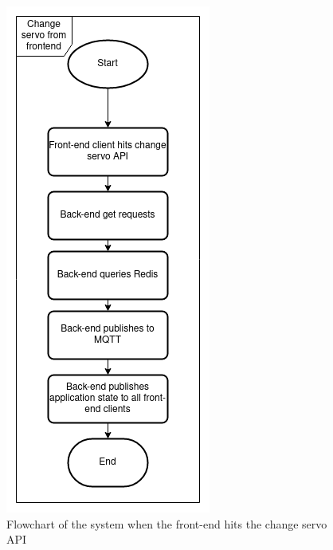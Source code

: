 \begin{figure}
      \centering
      \includegraphics[scale=0.44]{resources/flowchart-fe-change-servo.png}
      \caption{Flowchart of the system when the front-end hits the change servo API}
      \label{flowchart-fe-change-servo}
\end{figure}

